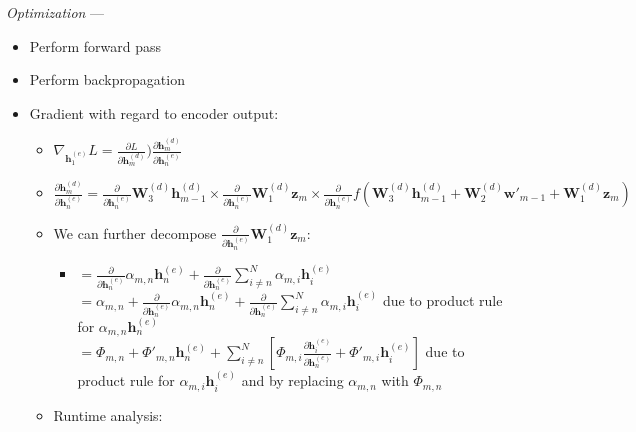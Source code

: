 \emph{Optimization} ---
\begin{itemize}
    \item Perform forward pass 
    \item Perform backpropagation
    \item Gradient with regard to encoder output:
    \begin{itemize}
        \item $\nabla_{\boldsymbol{h}_1^{(e)}} L = \frac{\partial L}{\partial \boldsymbol{h}_m^{(d)}} ) \frac{\partial \boldsymbol{h}_m^{(d)}}{\partial \boldsymbol{h}_{n}^{(e)}}$
        \item $\frac{\partial \boldsymbol{h}_m^{(d)}}{\partial \boldsymbol{h}_{n}^{(e)}} = \frac{\partial}{\partial \boldsymbol{h}_{n}^{(e)}} \boldsymbol{W}_3^{(d)} \boldsymbol{h}_{m-1}^{(d)}
        \times \frac{\partial}{\partial \boldsymbol{h}_{n}^{(e)}} \boldsymbol{W}_1^{(d)} \boldsymbol{z}_m
        \times \frac{\partial}{\partial \boldsymbol{h}_{n}^{(e)}} f ( \boldsymbol{W}_3^{(d)} \boldsymbol{h}_{m-1}^{(d)} + \boldsymbol{W}_2^{(d)} \boldsymbol{w'}_{m-1} + \boldsymbol{W}_1^{(d)} \boldsymbol{z}_m )$
        \item We can further decompose $\frac{\partial}{\partial \boldsymbol{h}_{n}^{(e)}} \boldsymbol{W}_1^{(d)} \boldsymbol{z}_m$:
        \begin{itemize}
            \item $
            =\frac{\partial}{\partial \boldsymbol{h}_n^{(e)}} \alpha_{m,n} \boldsymbol{h}_n^{(e)} + \frac{\partial}{\partial \boldsymbol{h}_n^{(e)}} \sum_{i \neq n}^N \alpha_{m,i} \boldsymbol{h}_i^{(e)}
            $\\
            $
            = \alpha_{m,n} + \frac{\partial}{\partial \boldsymbol{h}_n^{(e)}} \alpha_{m,n}\boldsymbol{h}_n^{(e)} + \frac{\partial}{\partial \boldsymbol{h}_n^{(e)}} \sum_{i \neq n}^N \alpha_{m,i} \boldsymbol{h}_i^{(e)}
            $ due to product rule for $\alpha_{m,n} \boldsymbol{h}_n^{(e)}$\\
            $
            = \Phi_{m,n} + \Phi'_{m,n} \boldsymbol{h}_n^{(e)} + \sum_{i \neq n}^N \left[\Phi_{m,i} \frac{\partial \boldsymbol{h}_i^{(e)}}{\partial \boldsymbol{h}_n^{(e)}} + \Phi'_{m,i} \boldsymbol{h}_i^{(e)} \right]
            $ due to product rule for $\alpha_{m,i} \boldsymbol{h}_i^{(e)}$ and by replacing $\alpha_{m,n}$ with $\Phi_{m,n}$
        \end{itemize}
        \item Runtime analysis:
        \begin{itemize}

\end{itemize}
\end{itemize}
\end{itemize}
